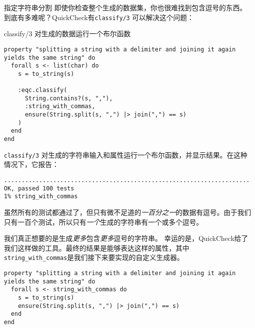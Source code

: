 \begin{example}{指定字符串分割}
即使你检查整个生成的数据集，你也很难找到包含逗号的东西。
到底有多难呢？QuickCheck有\texttt{classify/3} 可以解决这个问题：

\begin{code}{classify/3 对生成的数据运行一个布尔函数}

\begin{verbatim}
property "splitting a string with a delimiter and joining it again yields the same string" do
  forall s <- list(char) do
    s = to_string(s)

    :eqc.classify(
      String.contains?(s, ","),
      :string_with_commas,
      ensure(String.split(s, ",") |> join(",") == s)
    )
  end
end
\end{verbatim}
\end{code}

\texttt{classify/3}
对生成的字符串输入和属性运行一个布尔函数，并显示结果。在这种情况下，它报告：

\begin{code}{}\begin{verbatim}
....................................................................................................
OK, passed 100 tests
1% string_with_commas
\end{verbatim}
\end{code}

虽然所有的测试都通过了，但只有微不足道的\emph{一百分之一}的数据有逗号。由于我们只有一百个测试，所以只有\emph{一个}生成的字符串有一个或多个逗号。

我们真正想要的是生成\emph{更多}包含\emph{更多}逗号的字符串。
幸运的是，QuickCheck给了我们这样做的工具。最终的结果是能够表达这样的属性，其中\texttt{string\_with\_commas}是我们接下来要实现的自定义生成器。

\begin{code}{}
\begin{verbatim}
property "splitting a string with a delimiter and joining it again yields the same string" do
  forall s <- string_with_commas do
    s = to_string(s)
    ensure(String.split(s, ",") |> join(",") == s)
  end
end
\end{verbatim}
\end{code}

\end{example}


